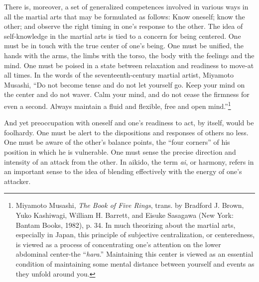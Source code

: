 There is, moreover, a set of generalized competences involved in various ways in all the martial arts that may be formulated as follows: Know oneself; know the other; and observe the right timing in one's response to the other. The idea of self-knowledge in the martial arts is tied to a concern for being centered. One must be in touch with the true center of one's being. One must be unified, the hands with the arms, the limbs with the torso, the body with the feelings and the mind. One must be poised in a state between relaxation and readiness to move-at all times. In the words of the seventeenth-century martial artist, Miyamoto Musashi, ``Do not become tense and do not let yourself go. Keep your mind on the center and do not waver. Calm your mind, and do not cease the firmness for even a second. Always maintain a fluid and flexible, free and open mind.''\footnote{Miyamoto Musashi, \emph{The Book of Five Rings}, trans. by Bradford J. Brown, Yuko Kashiwagi, William H. Barrett, and Eisuke Sasagawa (New York: Bantam Books, 1982), p. 34. In much theorizing about the martial arts, especially in Japan, this principle of subjective centralization, or centeredness, is viewed as a process of concentrating one's attention on the lower abdominal center-the ``\emph{hara}.'' Maintaining this center is viewed as an essential condition of maintaining some mental distance between yourself and events as they unfold around you.}

And yet preoccupation with oneself and one's readiness to act, by itself, would be foolhardy. One must be alert to the dispositions and responses of others no less. One must be aware of the other's balance points, the ``four corners'' of his position in which he is vulnerable. One must sense the precise direction and intensity of an attack from the other. In aikido, the term \emph{ai}, or harmony, refers in an important sense to the idea of blending effectively with the energy of one's attacker. 

